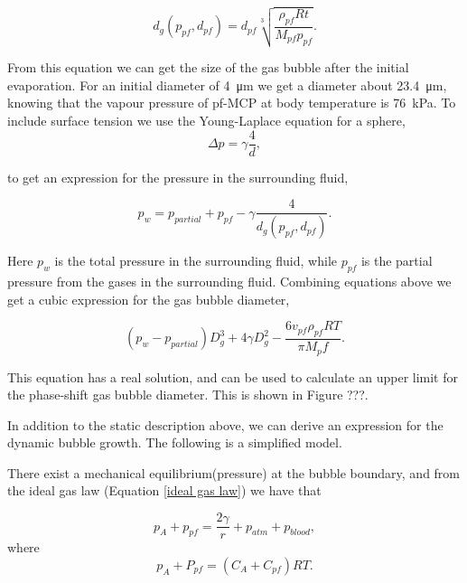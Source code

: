 \begin{equation}
\label{diameter}
d_g(p_{pf}, d_{pf}) = d_{pf}\sqrt[3]{\frac{\rho_{pf}Rt}{M_{pf}p_{pf}}}.
\end{equation}

From this equation we can get the size of the gas bubble after the initial evaporation. For an initial diameter of \SI{4}{\micro\metre} we get a diameter about \SI{23.4}{\micro\metre}, knowing that the vapour pressure of pf-MCP at body temperature is \SI{76}{\kilo\pascal}\cite{Healey2013}.
To include surface tension we use the Young-Laplace equation for a sphere,
\begin{equation}
\label{Young-Laplace}
\Delta p = \gamma\frac{4}{d},
\end{equation}

to get an expression for the pressure in the surrounding fluid, 

\begin{equation}
p_w = p_{partial} + p_{pf} - \gamma \frac{4}{d_g(p_{pf}\mathrm{, } d_{pf})}.
\end{equation}

Here $p_w$ is the total pressure in the surrounding fluid, while $p_{pf}$ is the partial pressure from the gases in the surrounding fluid. Combining equations above we get a cubic expression for the gas bubble diameter,  

\begin{equation}
\label{cubic}
(p_w-p_{partial})D_g^3 + 4\gamma D_g^2 - \frac{6v_{pf}\rho_{pf}RT}{\pi M_pf}.
\end{equation}

This equation has a real solution, and can be used to calculate an upper limit for the phase-shift gas bubble diameter. This is shown in Figure ???.

In addition to the static description above, we can derive an expression for the dynamic bubble growth. The following is a simplified model.

There exist a mechanical equilibrium(pressure) at the bubble boundary, and from the ideal gas law (Equation \eqref{ideal gas law}) we have that

\begin{equation}
\label{mec eq}
p_A + p_{pf} = \frac{2\gamma}{r} + p_{atm}+p_{blood}, 
\end{equation}
where
\begin{equation}
p_A + P_{pf}= (C_A+C_{pf})RT.
\end{equation}

